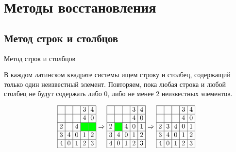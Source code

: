 \documentclass[8pt, hyperref={pdftex,unicode}, green]{beamer}
\newcommand{\cc}{\bf\cellcolor{green}}
\newcommand{\LSfive}[1]{
    \begin{array}{|>{\hspace{-2pt}}c<{\hspace{-2pt}}|>{\hspace{-2pt}}c<{\hspace{-2pt}}|>{\hspace{-2pt}}c<{\hspace{-2pt}}|>{\hspace{-2pt}}c<{\hspace{-2pt}}|>{\hspace{-2pt}}c<{\hspace{-2pt}}|}\hline
        #1
    \end{array}
}
\begin{document}
\section{Методы восстановления}
\subsection{Метод строк и столбцов}
\begin{frame}{Метод строк и столбцов}

    \begin{block}{}
        В каждом латинском квадрате системы ищем строку и столбец, содержащий только один неизвестный элемент. 
        Повторяем, пока любая строка и любой столбец не будут содержать либо 0, либо не менее 2 неизвестных элементов.
    \end{block}

    \begin{gather*}
        \LSfive{
             &  &  & 3 & 4 \\ \hline
             &  &  & 4 & 0 \\ \hline
            2 &  & 4 & \cc & \cc \\ \hline
            3 & 4 & 0 & 1 & 2 \\ \hline
            4 & 0 & 1 & 2 & 3 \\ \hline
        }
        \Rightarrow
        \LSfive {
             &  &  & 3 & 4 \\ \hline
             &  &  & 4 & 0 \\ \hline
            2 & \cc & 4 & 0 & 1 \\ \hline
            3 & 4 & 0 & 1 & 2 \\ \hline
            4 & 0 & 1 & 2 & 3 \\ \hline
        }
        \Rightarrow
        \LSfive{
             &  &  & 3 & 4 \\ \hline
             &  &  & 4 & 0 \\ \hline
            2 & 3 & 4 & 0 & 1 \\ \hline
            3 & 4 & 0 & 1 & 2 \\ \hline
            4 & 0 & 1 & 2 & 3 \\ \hline
        }
    \end{gather*}
\end{frame}
  
\end{document}
